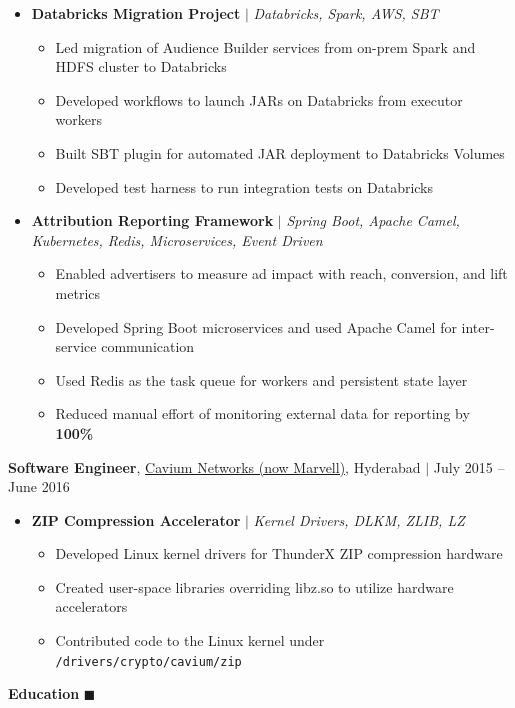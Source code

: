\documentclass[9pt]{extletter}
\begin{document}
\begin{itemize}
    \item \textbf{Databricks Migration Project} $|$ \textsl{Databricks, Spark, AWS, SBT}
    \begin{itemize}
        \itemsep2pt
        \item Led migration of Audience Builder services from on-prem Spark and HDFS cluster to Databricks
        \item Developed workflows to launch JARs on Databricks from executor workers
        \item Built SBT plugin for automated JAR deployment to Databricks Volumes
        \item Developed test harness to run integration tests on Databricks
    \end{itemize}
    
    \item \textbf{Attribution Reporting Framework} $|$ \textsl{Spring Boot, Apache Camel, Kubernetes, Redis, Microservices, Event Driven}
    \begin{itemize}
        \itemsep2pt
        \item Enabled advertisers to measure ad impact with reach, conversion, and lift metrics
        \item Developed Spring Boot microservices and used Apache Camel for inter-service communication
        \item Used Redis as the task queue for workers and persistent state layer
        \item Reduced manual effort of monitoring external data for reporting by \textbf{100\%}
    \end{itemize}
\end{itemize}
\vspace{-5pt}
{\textbf{Software Engineer}}, \href{https://www.marvell.com/}{Cavium Networks (now Marvell)}, Hyderabad  $|$ July 2015 -- June 2016 
\vspace{-5pt}
\begin{itemize}
    \item \textbf{ZIP Compression Accelerator} $|$ \textsl{Kernel Drivers, DLKM, ZLIB, LZ}
    \begin{itemize}
        \itemsep2pt
        \item Developed Linux kernel drivers for ThunderX ZIP compression hardware
        \item Created user-space libraries overriding libz.so to utilize hardware accelerators
        \item Contributed code to the Linux kernel under \texttt{/drivers/crypto/cavium/zip}
    \end{itemize}
\end{itemize}
\vspace{-\parskip}
\vspace{9pt}
\textbf{\Large Education} \hrulefill $\blacksquare$
\end{document}
